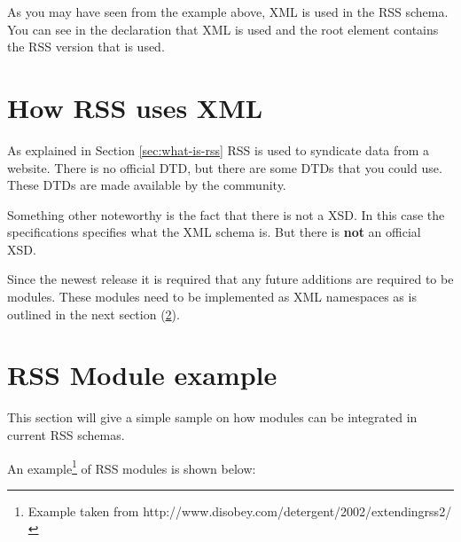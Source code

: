 

As you may have seen from the example above, XML is used in the RSS schema. You can see in the declaration that XML is used and the root element contains the RSS version that is used.

\section{How RSS uses XML}
As explained in Section \ref{sec:what-is-rss} RSS is used to syndicate data from a website. There is no official DTD, but there are some DTDs that you could use. These DTDs are made available by the community.

Something other noteworthy is the fact that there is not a XSD. In this case the specifications specifies what the XML schema is. But there is \textbf{not} an official XSD.

Since the newest release it is required that any future additions are required to be modules. These modules need to be implemented as XML namespaces as is outlined in the next section (\ref{sec:rss-module-example}).

\section{RSS Module example}
\label{sec:rss-module-example}
This section will give a simple sample on how modules can be integrated in current RSS schemas.

An example\footnote{Example taken from http://www.disobey.com/detergent/2002/extendingrss2/} of RSS modules is shown below:


